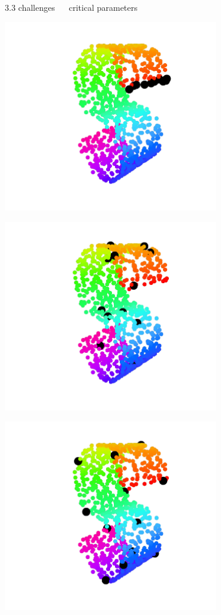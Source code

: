 \documentclass[11pt, compress, t, notes = noshow, xcolor = table, 
aspectratio = 1610]{beamer}
\begin{document}
\begin{frame}{\textcolor{gray!90}{3.3 challenges} ~~ critical parameters}
\begin{minipage}[t]{0.33\textwidth}
  \includegraphics[trim = 80 20 60 0, clip, %
      width = 0.7\textwidth]{figures/s-curve-pp-poor}
\end{minipage}%
\begin{minipage}[t]{0.33\textwidth}
  \includegraphics[trim = 80 20 60 0, clip, %
      width = 0.7\textwidth]{figures/s-curve-pp-random}
\end{minipage}%
\begin{minipage}[t]{0.33\textwidth}
    \includegraphics[trim = 80 20 60 0, clip, %
    width = 0.7\textwidth]{figures/s-curve-pp-maxmin}
\end{minipage}


\end{frame}
\end{document}
